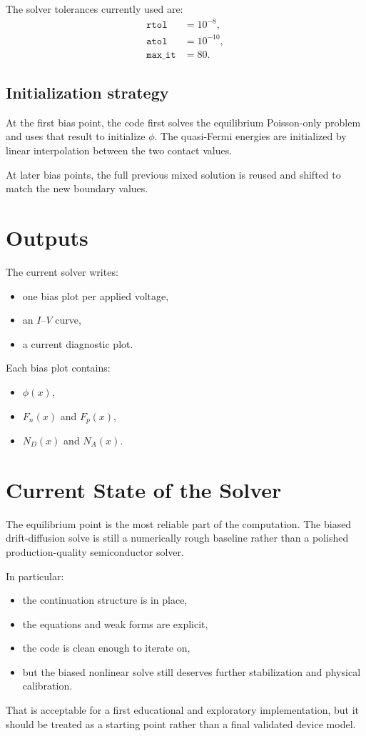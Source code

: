 \documentclass[11pt]{article}
\begin{document}
The solver tolerances currently used are:
\begin{align*}
    \texttt{rtol} &= 10^{-8}, \\
    \texttt{atol} &= 10^{-10}, \\
    \texttt{max\_it} &= 80.
\end{align*}

\subsection{Initialization strategy}

At the first bias point, the code first solves the equilibrium Poisson-only
problem and uses that result to initialize $\phi$. The quasi-Fermi energies are
initialized by linear interpolation between the two contact values.

At later bias points, the full previous mixed solution is reused and shifted to
match the new boundary values.

\section{Outputs}

The current solver writes:
\begin{itemize}
    \item one bias plot per applied voltage,
    \item an $I$--$V$ curve,
    \item a current diagnostic plot.
\end{itemize}

Each bias plot contains:
\begin{itemize}
    \item $\phi(x)$,
    \item $F_n(x)$ and $F_p(x)$,
    \item $N_D(x)$ and $N_A(x)$.
\end{itemize}

\section{Current State of the Solver}

The equilibrium point is the most reliable part of the computation.
The biased drift-diffusion solve is still a numerically rough baseline rather
than a polished production-quality semiconductor solver.

In particular:
\begin{itemize}
    \item the continuation structure is in place,
    \item the equations and weak forms are explicit,
    \item the code is clean enough to iterate on,
    \item but the biased nonlinear solve still deserves further stabilization and
    physical calibration.
\end{itemize}

That is acceptable for a first educational and exploratory implementation, but
it should be treated as a starting point rather than a final validated device model.
\end{document}
